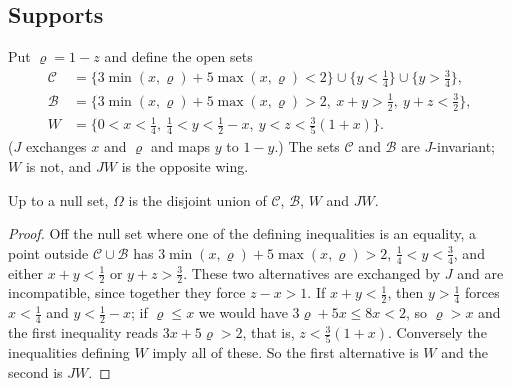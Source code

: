 \documentclass[11pt,colorlinks]{charlie}
\newcommand{\Om}{\Omega}
\begin{document}
\subsection{Supports}
Put $\varrho=1-z$ and define the open sets
\begin{align*}
 \mathcal C&=\{3\min(x,\varrho)+5\max(x,\varrho)<2\}\cup\{y<\tfrac14\}\cup\{y>\tfrac34\},\\
 \mathcal B&=\{3\min(x,\varrho)+5\max(x,\varrho)>2,\ x+y>\tfrac12,\ y+z<\tfrac32\},\\
 W&=\{0<x<\tfrac14,\ \tfrac14<y<\tfrac12-x,\ y<z<\tfrac35(1+x)\}.
\end{align*}
($J$ exchanges $x$ and $\varrho$ and maps $y$ to $1-y$.) The sets $\mathcal C$ and $\mathcal B$ are $J$-invariant; $W$ is not, and $JW$ is the opposite wing.

\begin{lemma}\label{lem:partition}
Up to a null set, $\Om$ is the disjoint union of $\mathcal C$, $\mathcal B$, $W$ and $JW$.
\end{lemma}
\begin{proof}
Off the null set where one of the defining inequalities is an equality, a point outside $\mathcal C\cup\mathcal B$ has $3\min(x,\varrho)+5\max(x,\varrho)>2$, $\frac14<y<\frac34$, and either $x+y<\frac12$ or $y+z>\frac32$. These two alternatives are exchanged by $J$ and are incompatible, since together they force $z-x>1$. If $x+y<\frac12$, then $y>\frac14$ forces $x<\frac14$ and $y<\frac12-x$; if $\varrho\le x$ we would have $3\varrho+5x\le8x<2$, so $\varrho>x$ and the first inequality reads $3x+5\varrho>2$, that is, $z<\frac35(1+x)$. Conversely the inequalities defining $W$ imply all of these. So the first alternative is $W$ and the second is $JW$.
\end{proof}
\end{document}
